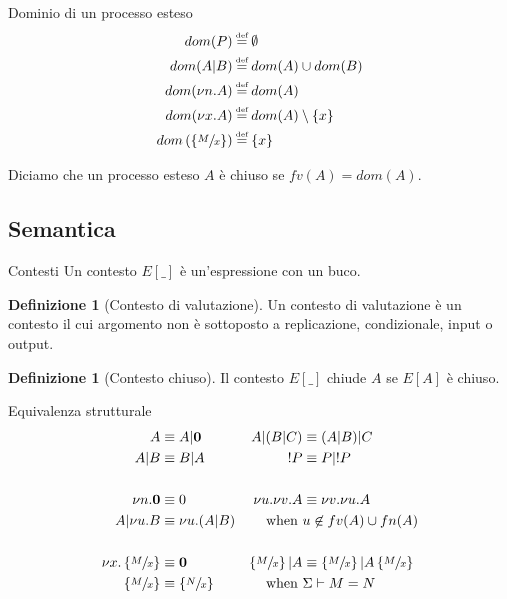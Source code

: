 \documentclass{beamer}
\newcounter{counter1}
\theoremstyle{plain}
\theoremstyle{definition}
\newtheorem{mydef}[counter1]{Definizione}
\theoremstyle{remark}
\newcommand{\set}[1]{\left\{#1\right\}}
\newcommand{\pa}[1]{\left(#1\right)}
\newcommand*{\eqdef}{\ensuremath{\overset{\mathclap{\text{\tiny def}}}{=}}}
\begin{document}
\begin{frame}{Dominio di un processo esteso}
  \begin{align*}
    dom(P) & \eqdef \emptyset \\
    dom(A|B) & \eqdef dom(A) \cup dom(B) \\
    dom(\nu n.A) & \eqdef dom(A) \\
    dom(\nu x.A) & \eqdef dom(A) \setminus \set{x}\\
    dom\pa{ \set{ \sfrac{M}{x}}} & \eqdef \set{x}           
  \end{align*}
  \vfill
  
  Diciamo che un processo esteso $A$ \`e chiuso se $fv(A) = dom(A)$.
\end{frame}

\subsection{Semantica}

\begin{frame}{Contesti}
  Un contesto $E[\_]$ \`e un'espressione con un buco.
  \begin{mydef}[Contesto di valutazione]
    Un contesto di valutazione \`e un contesto il cui argomento non
    \`e sottoposto a replicazione, condizionale, input o output.
  \end{mydef}
  \begin{mydef}[Contesto chiuso]
    Il contesto $E[\_]$ chiude $A$ se $E[A]$ \`e chiuso.
  \end{mydef}
\end{frame}


\begin{frame}{Equivalenza strutturale}
  \begin{align*}
    A & \equiv A|\mathbf{0} & A|(B|C) & \equiv (A|B)|C \\
    A|B & \equiv B|A & !P & \equiv P|!P \\ \\
    \nu n.\mathbf{0} & \equiv 0 & \nu u. \nu v.A & \equiv \nu v. \nu
                                                   u.A \\
    A| \nu u.B & \equiv \nu u. (A|B) & \text{when } & u\not\in fv(A)
                                                     \cup fn(A) \\ \\
    \nu x. \set{\sfrac{M}{x}} & \equiv \mathbf{0} & \set{\sfrac{M}{x}}
                                                    |A & \equiv
                                                         \set{\sfrac{M}{x}}
                                                         |
                                                         A\set{\sfrac{M}{x}}
    \\
    \set{\sfrac{M}{x}} & \equiv \set{\sfrac{N}{x}} & \text{when } &
                                                                   \Sigma
                                                                   \vdash M=N
  \end{align*}
\end{frame}
\end{document}
